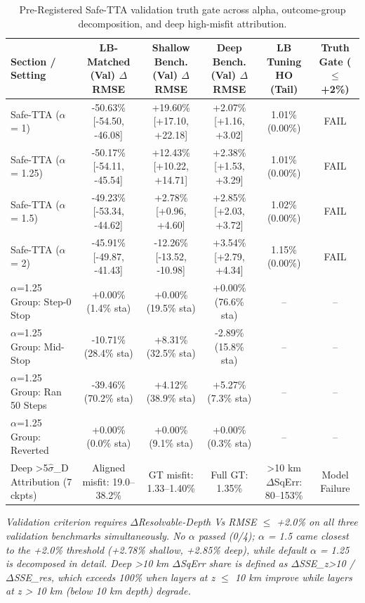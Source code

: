 \begin{table}[t]
\centering
\scriptsize
\caption{Pre-Registered Safe-TTA validation truth gate across alpha, outcome-group decomposition, and deep high-misfit attribution.}
\label{tab:safe_tta_audit}
\begin{tabular}{lccccc}
\toprule
Section / Setting & LB-Matched (Val) $\Delta$RMSE & Shallow Bench. (Val) $\Delta$RMSE & Deep Bench. (Val) $\Delta$RMSE & LB Tuning HO (Tail) & Truth Gate ($\le$+2\%) \\
\midrule
Safe-TTA ($\alpha$ = 1) & -50.63\% [-54.50, -46.08] & +19.60\% [+17.10, +22.18] & +2.07\% [+1.16, +3.02] & 1.01\% (0.00\%) & FAIL \\
Safe-TTA ($\alpha$ = 1.25) & -50.17\% [-54.11, -45.54] & +12.43\% [+10.22, +14.71] & +2.38\% [+1.53, +3.29] & 1.01\% (0.00\%) & FAIL \\
Safe-TTA ($\alpha$ = 1.5) & -49.23\% [-53.34, -44.62] & +2.78\% [+0.96, +4.60] & +2.85\% [+2.03, +3.72] & 1.02\% (0.00\%) & FAIL \\
Safe-TTA ($\alpha$ = 2) & -45.91\% [-49.87, -41.43] & -12.26\% [-13.52, -10.98] & +3.54\% [+2.79, +4.34] & 1.15\% (0.00\%) & FAIL \\
$\alpha$=1.25 Group: Step-0 Stop & +0.00\% (1.4\% sta) & +0.00\% (19.5\% sta) & +0.00\% (76.6\% sta) & -- & -- \\
$\alpha$=1.25 Group: Mid-Stop & -10.71\% (28.4\% sta) & +8.31\% (32.5\% sta) & -2.89\% (15.8\% sta) & -- & -- \\
$\alpha$=1.25 Group: Ran 50 Steps & -39.46\% (70.2\% sta) & +4.12\% (38.9\% sta) & +5.27\% (7.3\% sta) & -- & -- \\
$\alpha$=1.25 Group: Reverted & +0.00\% (0.0\% sta) & +0.00\% (9.1\% sta) & +0.00\% (0.3\% sta) & -- & -- \\
Deep >5$\hat{\sigma}$\_D Attribution (7 ckpts) & Aligned misfit: 19.0--38.2\% & GT misfit: 1.33--1.40\% & Full GT: 1.35\% & >10 km $\Delta$SqErr: 80--153\% & Model Failure \\
\bottomrule
\end{tabular}
\par\vspace{2pt}\noindent\footnotesize{\textit{Validation criterion requires $\Delta$Resolvable-Depth Vs RMSE $\le$ +2.0\% on all three validation benchmarks simultaneously. No $\alpha$ passed (0/4); $\alpha$ = 1.5 came closest to the +2.0\% threshold (+2.78\% shallow, +2.85\% deep), while default $\alpha$ = 1.25 is decomposed in detail. Deep >10 km $\Delta$SqErr share is defined as $\Delta$SSE\_{z>10} / $\Delta$SSE\_res, which exceeds 100\% when layers at z $\le$ 10 km improve while layers at z > 10 km (below 10 km depth) degrade.}}
\end{table}
